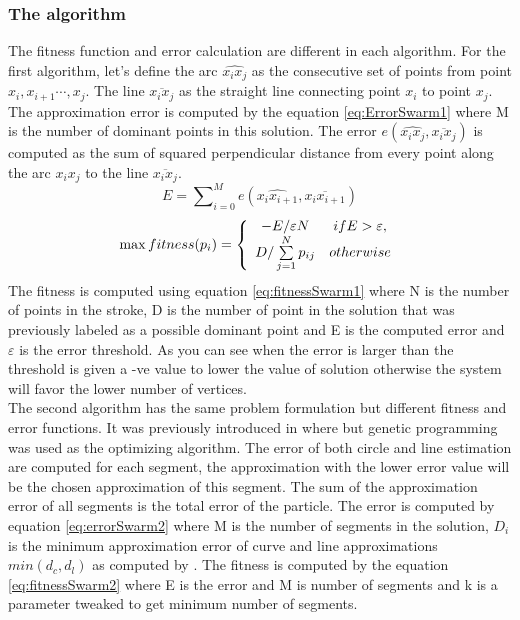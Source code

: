 \documentclass[a4paper,10pt]{IEEEconf}
\begin{document}
\subsubsection{The algorithm}
The fitness function and error calculation are different in each algorithm. For the first algorithm, 
let's define the arc $\widehat{x_ix_j}$ as the consecutive set of points from point $x_i,x_{i+1} \cdots,x_j$. The line
$\overline{x_i x_j} $ as the straight line connecting point $x_i$ to point $x_j$. The approximation error is computed by the equation \ref{eq:ErrorSwarm1}  where M is the number of dominant points in this solution.  The error $ e ( \widehat{x_ix_j},\overline{x_i x_j})$ is computed as the sum of squared perpendicular distance from every point along the arc $\widehat{x_ix_j}$ to the line $\overline{x_i x_j}$.  \\
\begin{equation}
E=\sum\nolimits_{i = 0}^M e ( \widehat{x_ix_{i+1}},\overline{x_i x_{i+1}})
\label{eq:ErrorSwarm1}
\end{equation}
\begin{equation}
\max fitness(p_i ) = \left\{ {\begin{array}{*{20}c}
   { - E/\varepsilon N} & {ifE > \varepsilon ,}  \\
   {D/\sum\limits_{j = 1}^N {p_{ij} } } & {otherwise}  \\
\end{array}} \right.
\label{eq:fitnessSwarm1}
\end{equation}%
The fitness is computed using equation \ref{eq:fitnessSwarm1} where N is the number of points in the stroke, D is the number of point in the solution that was previously labeled as a possible dominant point and E is the computed error and $\varepsilon$ is the error threshold.   As you can see when the error is larger than the threshold is given a -ve value to lower the value of solution otherwise the system will favor the lower number of vertices.\\ %
The second algorithm has the same problem formulation but different fitness and error functions. It was previously introduced in  \cite{CruveDivisionSwarm} where but genetic programming was used as the optimizing algorithm.  The error of both circle and line estimation are computed for each segment, the approximation with the lower error value will be the chosen approximation of this segment. The sum of the approximation error of all segments is the total error of the particle.  The error is computed by equation \ref{eq:errorSwarm2} where M is the number of segments in the solution, $D_i$ is the minimum approximation error of curve and line approximations $min(d_c,d_l)$ as computed by \cite{CruveDivisionSwarm}.  The fitness is computed by the equation \ref{eq:fitnessSwarm2} where E is the error and M is number of segments and k is a parameter tweaked to get minimum number of segments. \\
\end{document}
